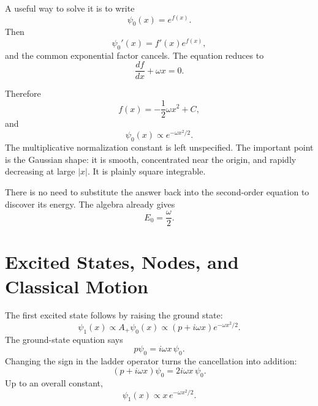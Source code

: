 \begin{classroomqa}
\end{classroomqa}

A useful way to solve it is to write
\begin{equation}
\psi_{0}(x)=e^{f(x)}.
\end{equation}
Then
\[
\psi_{0}'(x)=f'(x)e^{f(x)},
\]
and the common exponential factor cancels. The equation reduces to
\begin{equation}
\frac{df}{dx}+\omega x=0.
\end{equation}

\begin{classroomqa}
\end{classroomqa}

Therefore
\begin{equation}
f(x)=-\frac12\omega x^{2}+C,
\end{equation}
and
\begin{equation}
\psi_{0}(x)\propto e^{-\omega x^{2}/2}.
\end{equation}
The multiplicative normalization constant is left unspecified. The important point is the Gaussian shape: it is smooth, concentrated near the origin, and rapidly decreasing at large \(\lvert x\rvert\). It is plainly square integrable.

There is no need to substitute the answer back into the second-order equation to discover its energy. The algebra already gives
\begin{equation}
E_{0}=\frac{\omega}{2}.
\end{equation}

\section{Excited States, Nodes, and Classical Motion}

The first excited state follows by raising the ground state:
\begin{equation}
\psi_{1}(x)\propto A_{+}\psi_{0}(x)
\propto(p+i\omega x)e^{-\omega x^{2}/2}.
\end{equation}
The ground-state equation says
\[
p\psi_{0}=i\omega x\,\psi_{0}.
\]
Changing the sign in the ladder operator turns the cancellation into addition:
\begin{equation}
(p+i\omega x)\psi_{0}
=2i\omega x\,\psi_{0}.
\end{equation}
Up to an overall constant,
\begin{equation}
\psi_{1}(x)\propto x\,e^{-\omega x^{2}/2}.
\end{equation}

